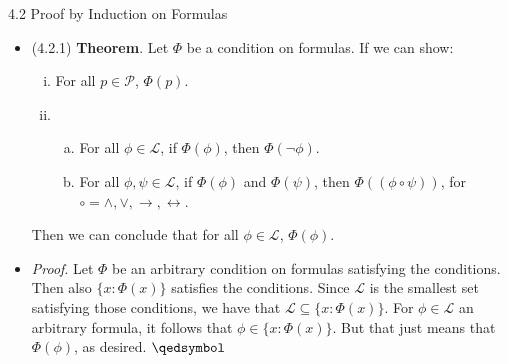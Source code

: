 \documentclass[../slides.tex]{subfiles}
\begin{document}
\begin{frame}{4.2 Proof by Induction on Formulas}

	\begin{itemize}
	
		\item (4.2.1) \textbf{Theorem}. Let $\Phi$ be a condition on formulas. If we can show:
		\begin{enumerate}[(i)]
		
			\item For all $p\in\mathcal{P}$, $\Phi(p)$.
			
			\item \begin{enumerate}[(a)]
			
			\item For all $\phi\in\mathcal{L}$, if $\Phi(\phi)$, then $\Phi(\neg\phi)$.

			\item For all $\phi,\psi\in\mathcal{L}$, if $\Phi(\phi)$ and $\Phi(\psi)$, then $\Phi((\phi\circ\psi))$, for $\circ=\land,\lor,\to,\leftrightarrow$.
		
		\end{enumerate}
		\end{enumerate}
		Then we can conclude that for all $\phi\in\mathcal{L}$, $\Phi(\phi)$.
		
		\item \emph{Proof}. Let $\Phi$ be an arbitrary condition on formulas satisfying the conditions. Then also $\{x:\Phi(x)\}$ satisfies the conditions. Since $\mathcal{L}$ is the smallest set satisfying those conditions, we have that $\mathcal{L}\subseteq\{x:\Phi(x)\}$. For $\phi\in\mathcal{L}$ an arbitrary formula, it follows that $\phi\in\{x:\Phi(x)\}$. But that just means that $\Phi(\phi)$, as desired. $\qedsymbol$

	\end{itemize}


\end{frame}
		
\end{document}

